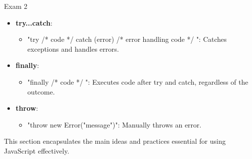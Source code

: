 \begin{examnotes}{Exam 2}
\begin{highlight}
        \begin{itemize}
            \item \textbf{try...catch}:
                \begin{itemize}
                    \item "try { /* code */ } catch (error) { /* error handling code */ }": Catches exceptions and handles errors.
                \end{itemize}
            \item \textbf{finally}:
                \begin{itemize}
                    \item "finally { /* code */ }": Executes code after try and catch, regardless of the outcome.
                \end{itemize}
            \item \textbf{throw}:
                \begin{itemize}
                    \item "throw new Error("message")": Manually throws an error.
                \end{itemize}
        \end{itemize}
    \end{highlight}
    
    \begin{highlight}
        This section encapsulates the main ideas and practices essential for using JavaScript effectively.
        

\end{highlight}
\end{examnotes}
